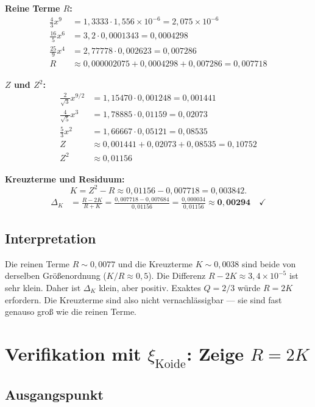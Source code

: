 \textbf{Reine Terme $R$:}
\begin{align*}
  \tfrac{4}{3}x^9 &= 1{,}3333\cdot1{,}556\times10^{-6}=2{,}075\times10^{-6} \\
  \tfrac{16}{5}x^6 &= 3{,}2\cdot0{,}0001343=0{,}0004298 \\
  \tfrac{25}{9}x^4 &= 2{,}77778\cdot0{,}002623=0{,}007286 \\
  R &\approx 0{,}000002075+0{,}0004298+0{,}007286=0{,}007718
\end{align*}

\textbf{$Z$ und $Z^2$:}
\begin{align*}
  \tfrac{2}{\sqrt{3}}x^{9/2} &= 1{,}15470\cdot0{,}001248=0{,}001441 \\
  \tfrac{4}{\sqrt{5}}x^3 &= 1{,}78885\cdot0{,}01159=0{,}02073 \\
  \tfrac{5}{3}x^2 &= 1{,}66667\cdot0{,}05121=0{,}08535 \\
  Z &\approx 0{,}001441+0{,}02073+0{,}08535=0{,}10752 \\
  Z^2 &\approx 0{,}01156
\end{align*}

\textbf{Kreuzterme und Residuum:}
\[
  K=Z^2-R\approx0{,}01156-0{,}007718=0{,}003842.
\]
\begin{align*}
  \Delta_K &= \frac{R-2K}{R+K}
  = \frac{0{,}007718-0{,}007684}{0{,}01156}
  = \frac{0{,}000034}{0{,}01156}
  \approx\mathbf{0{,}00294}\quad\checkmark
\end{align*}

\subsection{Interpretation}

Die reinen Terme $R\sim0{,}0077$ und die Kreuzterme $K\sim0{,}0038$
sind beide von derselben Größenordnung ($K/R\approx0{,}5$).
Die Differenz $R-2K\approx3{,}4\times10^{-5}$ ist sehr klein.
Daher ist $\Delta_K$ klein, aber positiv.
Exaktes $Q=2/3$ würde $R=2K$ erfordern.
Die Kreuzterme sind also nicht vernachlässigbar —
sie sind fast genauso groß wie die reinen Terme.

\section{Verifikation mit $\xi_{\text{Koide}}$: Zeige $R=2K$}


\subsection{Ausgangspunkt}

